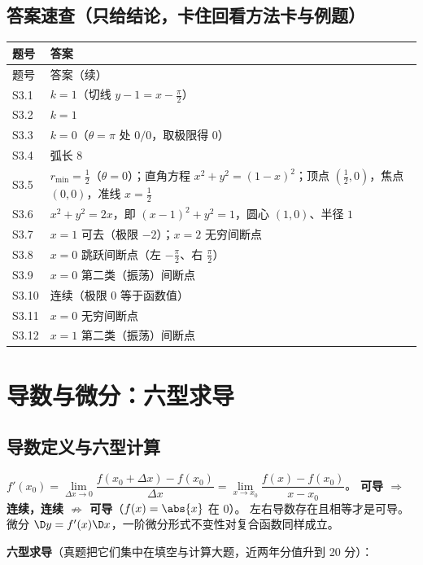 \documentclass[11pt,a4paper]{ctexart}
\begin{document}
\subsection{答案速查（只给结论，卡住回看方法卡与例题）}
{\footnotesize
\begin{longtable}{@{}p{1.6cm}p{13.0cm}@{}}
\toprule 题号 & 答案 \\ \midrule
\endfirsthead
\toprule 题号 & 答案（续） \\ \midrule
\endhead
\midrule
\endfoot
\bottomrule
\endlastfoot
S3.1 & $k=1$（切线 $y-1=x-\frac{\pi}{2}$） \\
S3.2 & $k=1$ \\
S3.3 & $k=0$（$\theta=\pi$ 处 $0/0$，取极限得 $0$） \\
S3.4 & 弧长 $8$ \\
S3.5 & $r_{\min}=\frac12$（$\theta=0$）；直角方程 $x^{2}+y^{2}=(1-x)^{2}$；顶点 $(\frac12,0)$，焦点 $(0,0)$，准线 $x=\frac12$ \\
S3.6 & $x^{2}+y^{2}=2x$，即 $(x-1)^{2}+y^{2}=1$，圆心 $(1,0)$、半径 $1$ \\
S3.7 & $x=1$ 可去（极限 $-2$）；$x=2$ 无穷间断点 \\
S3.8 & $x=0$ 跳跃间断点（左 $-\frac\pi2$、右 $\frac\pi2$） \\
S3.9 & $x=0$ 第二类（振荡）间断点 \\
S3.10 & 连续（极限 $0$ 等于函数值） \\
S3.11 & $x=0$ 无穷间断点 \\
S3.12 & $x=1$ 第二类（振荡）间断点
\end{longtable}}

\bigskip
\section{导数与微分：六型求导}
\subsection{导数定义与六型计算}

\begin{keypoint}[定义与关系]
$f'(x_0)=\lim\limits_{\Delta x\to0}\dfrac{f(x_0+\Delta x)-f(x_0)}{\Delta x}
=\lim\limits_{x\to x_0}\dfrac{f(x)-f(x_0)}{x-x_0}$。
\textbf{可导 $\Rightarrow$ 连续，连续 $\nRightarrow$ 可导}（$f(x)=\abs{x}$ 在 $0$）。
左右导数存在且相等才是可导。微分 $\D y=f'(x)\D x$，一阶微分形式不变性对复合函数同样成立。
\end{keypoint}

\noindent\textbf{六型求导}（真题把它们集中在填空与计算大题，近两年分值升到 20 分）：
\end{document}
